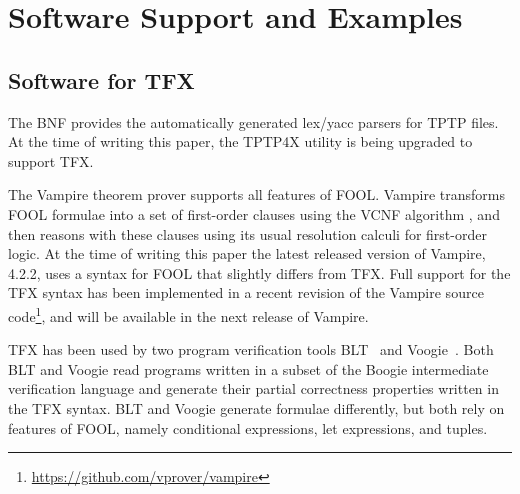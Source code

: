 \documentclass{easychair}
\begin{document}

\section{Software Support and Examples}
\label{ImplementationExamples}

\subsection{Software for TFX}
\label{Software}
The BNF provides the automatically generated lex/yacc parsers for TPTP files.
At the time of writing this paper, the TPTP4X utility is being upgraded
to support TFX.

The Vampire theorem prover \cite{KV13} supports all features of FOOL. 
Vampire transforms FOOL formulae into a set of first-order clauses using the 
VCNF algorithm \cite{KK+16-GCAI}, and then reasons with these clauses using 
its usual resolution calculi for first-order logic. 
At the time of writing this paper the latest released version of Vampire,
4.2.2, uses a syntax for FOOL that slightly differs from TFX. 
Full support for the TFX syntax has been implemented in a recent revision of 
the Vampire source code\footnote{%
\url{https://github.com/vprover/vampire}}, and will be available
in the next release of Vampire.

TFX has been used by two program verification tools BLT~\cite{CF17} and
Voogie~\cite{KKV18}. 
Both BLT and Voogie read programs written in a subset of the Boogie 
intermediate verification language and generate their partial correctness 
properties written in the TFX syntax. 
BLT and Voogie generate formulae differently, but both rely on features of 
FOOL, namely conditional expressions, let expressions, and tuples.
\end{document}
